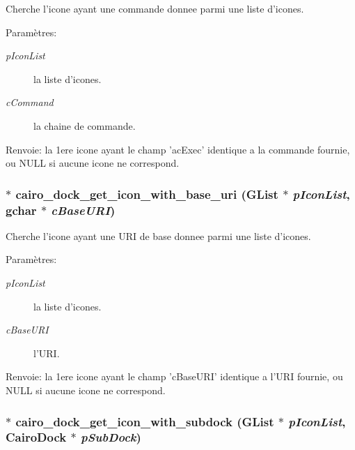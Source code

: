 Cherche l'icone ayant une commande donnee parmi une liste d'icones. \begin{Desc}
\item[Paramètres:]
\begin{description}
\item[{\em pIconList}]la liste d'icones. \item[{\em cCommand}]la chaine de commande. \end{description}
\end{Desc}
\begin{Desc}
\item[Renvoie:]la 1ere icone ayant le champ 'acExec' identique a la commande fournie, ou NULL si aucune icone ne correspond. \end{Desc}
\subsubsection{$\ast$ cairo\_\-dock\_\-get\_\-icon\_\-with\_\-base\_\-uri (GList $\ast$ {\em pIconList}, gchar $\ast$ {\em cBaseURI})}\label{cairo-dock-icons_8h_b2ba28fe9c6626243086a80a12cfd97f}


Cherche l'icone ayant une URI de base donnee parmi une liste d'icones. \begin{Desc}
\item[Paramètres:]
\begin{description}
\item[{\em pIconList}]la liste d'icones. \item[{\em cBaseURI}]l'URI. \end{description}
\end{Desc}
\begin{Desc}
\item[Renvoie:]la 1ere icone ayant le champ 'cBaseURI' identique a l'URI fournie, ou NULL si aucune icone ne correspond. \end{Desc}
\subsubsection{$\ast$ cairo\_\-dock\_\-get\_\-icon\_\-with\_\-subdock (GList $\ast$ {\em pIconList}, {\bf CairoDock} $\ast$ {\em pSubDock})}\label{cairo-dock-icons_8h_87b911e3bc92d45896c945589290d586}


